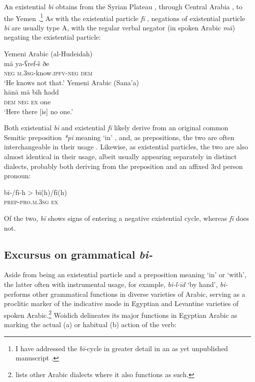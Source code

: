 \documentclass[output=paper,colorlinks,citecolor=brown]{langscibook}
\begin{document}
An existential \textit{bī} obtains from the Syrian Plateau \citep[346–348, map 336]{behnstedt1997a}, through Central Arabia \citep[44--45]{ingham1994a}, to the Yemen \citep[346, map 136]{behnstedt2016a}.\footnote{I have addressed the \textit{bī}-cycle in greater detail in an as yet unpublished manuscript \citet{wilmsen2020b}.} As with the existential particle \textit{fī} \citep[7]{Croft1991}, negations of existential particle \textit{bī} are usually type A, with the regular verbal negator (in spoken Arabic \textit{mā}) negating the existential particle:

\ea \label{ex:WiAR-22}
  \ea Yemeni Arabic (al-Hudeidah)\\
  	\gll mā ya-ʕref-š ðe\\
  	\textsc{neg} \textsc{m.3sg}-know.\textsc{ipfv-neg} \textsc{dem}\\
  	\glt ‘He knows not that.’ \citep[210]{simeone-senelle1996a}	
  \ex Yemeni Arabic (Sana’a)\\
  	\gll hānā mā bih ħadd\\
  	\textsc{dem} \textsc{neg} \textsc{ex} one\\
  	\glt ‘Here there [is] no one.’ \citep[163]{watson1993a}
\z \z

Both existential \textit{bī} and existential \textit{fī} likely derive from an original common Semitic preposition \textit{*pi} meaning ‘in’ \citep[470]{lipi2001a}, and, as prepositions, the two are often interchangeable in their usage \citep[479]{cowell2005a}. Likewise, as existential particles, the two are also almost identical in their usage, albeit usually appearing separately in distinct dialects, probably both deriving from the preposition and an affixed 3rd person pronoun:

\ea \label{ex:WiAR-23}
	\gll bī-/fī-h > bī(h)/fī(h)\\
	\textsc{prep-pro.m.3sg} {} \textsc{ex}\\
	\glt
\z


Of the two, \textit{bī} shows signs of entering a negative existential cycle, whereas \textit{fī} does not.

\subsection{Excursus on grammatical \textit{bi-}} \label{s:WiAR-4.1}

Aside from being an existential particle and a preposition meaning ‘in’ or ‘with’, the latter often with instrumental usage, for example, \textit{bi-l-īd} ‘by hand’, \textit{bi-} performs other grammatical functions in diverse varieties of Arabic, serving as a proclitic marker of the indicative mode in Egyptian \citep[61, 280–284]{woidich2006a} and Levantine \citep[180, 324–329]{cowell2005a} varieties of spoken Arabic.\footnote{\citet[64]{retsoe2014a} lists other Arabic dialects where it also functions as such.} Woidich delineates its major functions in Egyptian Arabic as marking the actual (a) or habitual (b) action of the verb:
\end{document}
